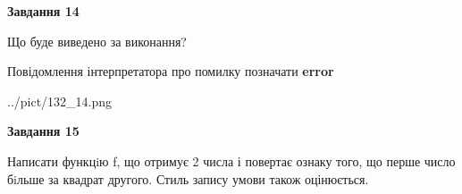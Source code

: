 \documentclass[11pt, ukrainian]{article}
\begin{document}
{\begin {large}
{\begin {center}\textbf{Завдання 14}\end {center}}\par
Що буде виведено за виконання? \par
Повідомлення інтерпретатора про помилку позначати \textbf{error}

\begin{center}
	{../pict/132_14.png}
\end{center}
\newpage

{\begin {center}\textbf{Завдання 15}\end {center}}\par

Написати функцiю f, що отримує 2 числа і повертає ознаку того, що перше число бiльше за квадрат другого. Стиль запису умови також оцінюється.\par
\newpage

\end {large}}
\end{document}
